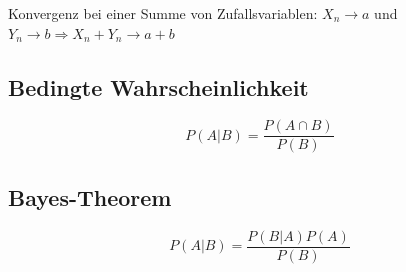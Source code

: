 Konvergenz bei einer Summe von Zufallsvariablen: \(X_n \rightarrow a\) und \(Y_n \rightarrow b \Longrightarrow X_n + Y_n \rightarrow a + b\)

\subsection{Bedingte Wahrscheinlichkeit}

\begin{equation*}
    P(A|B)=\frac{P(A\cap B)}{P(B)}
\end{equation*}

\subsection{Bayes-Theorem}

\begin{equation*}
    P(A|B)=\frac{P(B|A)P(A)}{P(B)}
\end{equation*}
